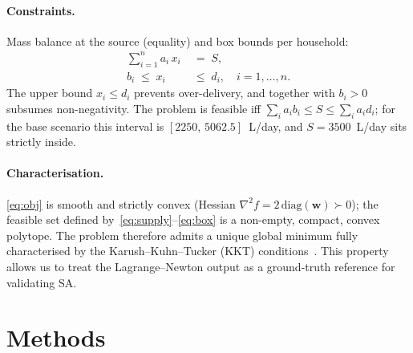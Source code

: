 \paragraph{Constraints.}
Mass balance at the source (equality) and box bounds per
household:
\begin{align}
  \sum_{i=1}^{n} a_i\,x_i \;&=\; S, \label{eq:supply}\\
  b_i \;\leq\; x_i \;&\leq\; d_i, \quad i = 1,\dots,n.
  \label{eq:box}
\end{align}
The upper bound $x_i \leq d_i$ prevents over-delivery, and
together with $b_i > 0$ subsumes non-negativity. The problem is
feasible iff $\sum_i a_i b_i \leq S \leq \sum_i a_i d_i$; for the
base scenario this interval is $[2250,\, 5062.5]$~\si{L/day}, and
$S = 3500$~\si{L/day} sits strictly inside.

\paragraph{Characterisation.}
\eqref{eq:obj} is smooth and strictly convex (Hessian
$\nabla^{2} f = 2\,\mathrm{diag}(\mathbf{w}) \succ 0$); the
feasible set defined by~\eqref{eq:supply}--\eqref{eq:box} is a
non-empty, compact, convex polytope. The problem therefore admits
a unique global minimum fully characterised by the
Karush--Kuhn--Tucker (KKT) conditions~\citep[Ch.~12]{nocedal2006}.
This property allows us to treat the Lagrange--Newton output as a
ground-truth reference for validating SA.

\section{Methods}
\label{sec:methods}

